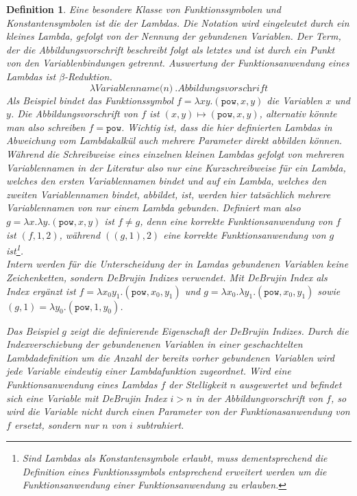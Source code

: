 \newtheorem{dLambda}[bsp]{Definition}
\begin{dLambda}
Eine besondere Klasse von Funktionssymbolen und Konstantensymbolen ist die der Lambdas. Die Notation wird eingeleutet durch ein kleines Lambda, gefolgt von der Nennung der gebundenen Variablen. Der Term, der die Abbildungsvorschrift beschreibt folgt als letztes und ist durch ein Punkt von den Variablenbindungen getrennt. Auswertung der Funktionsanwendung eines Lambdas ist $\beta$-Reduktion. 
$$
\lambda \textit{Variablenname(n)}~.\textit{Abbildungsvorschrift}
$$
Als Beispiel bindet das Funktionssymbol $f = \lambda x y.(\texttt{pow}, x, y)$ die Variablen $x$ und $y$. Die Abbildungsvorschrift von $f$ ist $(x, y) \mapsto (\texttt{pow}, x, y)$, alternativ könnte man also schreiben $f = \texttt{pow}$. Wichtig ist, dass die hier definierten Lambdas in Abweichung vom Lambdakalkül auch mehrere Parameter direkt abbilden können. Während die Schreibweise eines einzelnen kleinen Lambdas gefolgt von mehreren Variablennamen in der Literatur also nur eine Kurzschreibweise für ein Lambda, welches den ersten Variablennamen bindet und auf ein Lambda, welches den zweiten Variablennamen bindet, abbildet, ist, werden hier tatsächlich mehrere Variablennamen von nur einem Lambda gebunden. Definiert man also $g = \lambda x.\lambda y.(\texttt{pow}, x, y)$ ist $f \neq g$, denn eine korrekte Funktionsanwendung von $f$ ist $(f, 1, 2)$, während $((g, 1), 2)$ eine korrekte Funktionsanwendung von $g$ ist\footnote{Sind Lambdas als Konstantensymbole erlaubt, muss dementsprechend die Definition eines Funktionssymbols entsprechend erweitert werden um die Funktionsanwendung einer Funktionsanwendung zu erlauben.}. \\
Intern werden für die Unterscheidung der in Lamdas gebundenen Variablen keine Zeichenketten, sondern DeBrujin Indizes verwendet. Mit DeBrujin Index als Index ergänzt ist $f = \lambda x_0 y_1.(\texttt{pow}, x_0, y_1)$ und $g = \lambda x_0.\lambda y_1.(\texttt{pow}, x_0, y_1)$ sowie $(g, 1) = \lambda y_0.(\texttt{pow}, 1, y_0)$.

Das Beispiel $g$ zeigt die definierende Eigenschaft der DeBrujin Indizes. Durch die Indexverschiebung der gebundenenen Variablen in einer geschachtelten Lambdadefinition um die Anzahl der bereits vorher gebundenen Variablen wird jede Variable eindeutig einer Lambdafunktion zugeordnet. Wird eine Funktionsanwendung eines Lambdas $f$ der Stelligkeit $n$ ausgewertet und befindet sich eine Variable mit DeBrujin Index $i > n$ in der Abbildungvorschrift von $f$, so wird die Variable nicht durch einen Parameter von der Funktionasanwendung von $f$ ersetzt, sondern nur $n$ von $i$ subtrahiert.
\end{dLambda}

